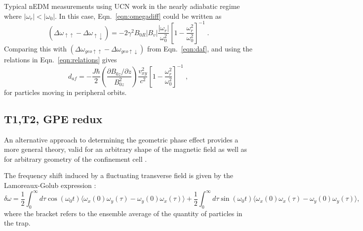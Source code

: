 Typical nEDM measurements using UCN work in the nearly adiabatic
regime where $|\omega_r| < |\omega_0|$.  In this case,
Eqn.~\ref{eqn:omegadiff} could be written as
%
\begin{equation}
(\Delta \omega_{\uparrow\uparrow} - \Delta \omega_{\uparrow\downarrow}) = -2\gamma^2 B_{0R} |B_{v}| \frac{|\omega_r|}{\omega_0^2} \left[1-\frac{\omega_r^2}{\omega_0^2}\right]^{-1} \;.
\end{equation}
%
Comparing this with
$(\Delta \omega_{geo\uparrow\uparrow} - \Delta
\omega_{geo\uparrow\downarrow})$ from Eqn.~\ref{eqn:daf}, and using
the relations in Eqn.~\ref{eqn:relations} gives
%
\begin{equation}
d_{af} = -\frac{J \hbar}{2} \left( \frac{\partial B_{0z} / \partial z}{B_{0z}^2} \right) \frac{v_{xy}^2}{c^2} \left[1-\frac{\omega_r^2}{\omega_0^2}\right]^{-1} \; ,
\end{equation}
%
for particles moving in peripheral orbits.

\subsection{T1,T2, GPE redux}

An alternative approach to determining the geometric phase effect
provides a more general theory, valid for an arbitrary shape of the
magnetic field as well as for arbitrary geometry of the confinement
cell \cite{pignol2012electric}.

The frequency shift induced by a fluctuating transverse field is given
by the Lamoreaux-Golub expression \cite{LamGol2005}:
%
\begin{equation}
\delta \omega = \frac{1}{2}\int_{0}^{\infty}d\tau \cos(\omega_0 t) \langle\omega_x(0) \omega_y(\tau) - \omega_y(0) \omega_x(\tau)\rangle + \frac{1}{2}\int_{0}^{\infty}d\tau \sin(\omega_0 t) \langle\omega_x(0) \omega_x(\tau) - \omega_y(0) \omega_y(\tau)\rangle ,
\end{equation}
%
where the bracket refers to the ensemble average of the quantity of
particles in the trap.

